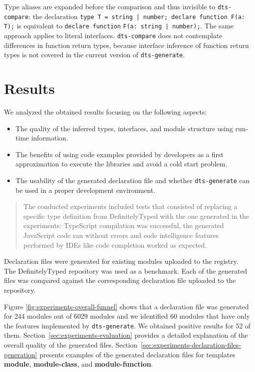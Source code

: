 \documentclass[english,cleveref,autoref,submission]{programming}
\begin{document}
Type aliases are expanded before the comparison and thus invisible to
\texttt{dts-compare}: the declaration
\lstinline{type T = string | number; declare function F(a: T);} is equivalent to
\lstinline{declare function} \lstinline{F(a: string | number);}. The same approach applies to literal
interfaces. \texttt{dts-compare} does 
not contemplate differences in function return types, because interface inference of
function return types is not covered in the current version of \texttt{dts-generate}. 

\section{Results}
\label{sec:results}
We analyzed the obtained results focusing on the following aspects:
\begin{itemize}
  \item The quality of the inferred types, interfaces, and module structure using run-time information.
  \item The benefits of using code examples provided by developers as a first approximation to execute the libraries and avoid a cold start problem.
  \item The usability of the generated declaration file and whether \texttt{dts-generate} can be used in a proper development environment.
\end{itemize}

\begin{quotation}
  The conducted experiments included tests that consisted of replacing
  a specific type definition from DefinitelyTyped
  \cite{definitely-typed-repository} with the one generated in the
  experiments: TypeScript compilation was successful, the generated
  JavaScript code ran without errors and code intelligence features
  performed by IDEs like code completion worked as expected.
\end{quotation}

Declaration files were generated for existing modules uploaded to the
\NPM{} registry. The DefinitelyTyped repository was used as a
benchmark. Each of the generated files was compared against the
corresponding declaration file uploaded to the repository.

Figure \ref{fig:experiments-overall-funnel} shows that a declaration file was generated
for 244 modules out of 6029 modules and we identified 60 modules that have only the
features implemented by \texttt{dts-generate}. We obtained positive results for 52 of
them. Section~\ref{sec:experiments-evaluation} provides a detailed explanation of the overall
quality of the generated files.
Section~\ref{sec:experiments-declaration-files-generation} presents examples of the generated declaration files for
templates \textbf{module}, \textbf{module-class}, and \textbf{module-function}. 
\end{document}
